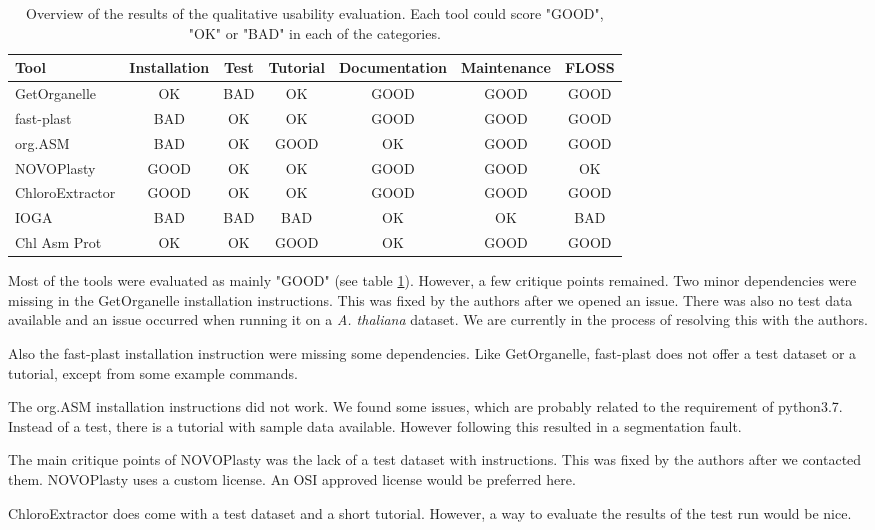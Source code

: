 \documentclass{bmcart}
\begin{document}
\begin{table}[]
    \centering
\begin{tabular}{lcccccc}   
Tool & Installation & Test & Tutorial & Documentation & Maintenance & FLOSS\\                           \hline 
GetOrganelle & OK & BAD & OK & GOOD & GOOD & GOOD\\  
fast-plast & BAD & OK & OK & GOOD & GOOD & GOOD\\ 
org.ASM & BAD & OK & GOOD & OK & GOOD & GOOD\\ 
NOVOPlasty & GOOD & OK & OK & GOOD & GOOD & OK\\
ChloroExtractor & GOOD & OK & OK & GOOD & GOOD & GOOD\\
IOGA & BAD & BAD & BAD & OK & OK  & BAD\\
Chl Asm Prot & OK & OK & GOOD & OK & GOOD & GOOD\\ 
\end{tabular}      
    \caption{Overview of the results of the qualitative usability evaluation. Each tool 
    could score "GOOD", "OK" or "BAD" in each of the categories.}
    \label{tab:resultsQual}
\end{table}


Most of the tools were evaluated as mainly "GOOD" (see table \ref{tab:resultsQual}). However, a few critique points remained.
Two minor dependencies were missing in the GetOrganelle installation instructions. This was fixed by the authors after we opened an issue. There was also no test data available and an issue occurred when running it on a \textit{A. thaliana} dataset. We are currently in the process of resolving this with the authors.

Also the fast-plast installation instruction were missing some dependencies. Like GetOrganelle, fast-plast does not offer a test dataset or a tutorial, except from some example commands. 

The org.ASM installation instructions did not work. We found some issues, which are probably related to the requirement of python3.7. Instead of a test, there is a tutorial with sample data available. However following this resulted in a segmentation fault.

The main critique points of NOVOPlasty was the lack of a test dataset with instructions. This was fixed by the authors after we contacted them. NOVOPlasty uses a custom license. An OSI approved license would be preferred here.

ChloroExtractor does come with a test dataset and a short tutorial. However, a way to evaluate the results of the test run would be nice.
\end{document}

